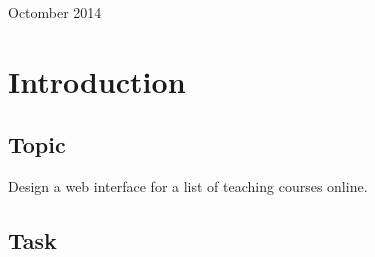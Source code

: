 \documentclass[12pt]{article}
\begin{document}
\begin{titlepage}
\begin{center}
      \vspace{5 mm}


      {\large Octomber 2014}\\[3cm] %




      \vfill %
      \end{center}
      \end{titlepage}



  \section{Introduction}

  \subsection{Topic}

  Design a web interface for a list of teaching courses online.

  \subsection{Task}
\end{document}
